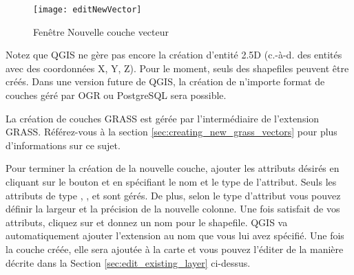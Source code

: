 \begin{itemize}
\begin{figure}[ht]
  \begin{center}
  \caption{Fenêtre Nouvelle couche vecteur \nixcaption}\label{fig:newvectorlayer}\smallskip
  \texttt{[image: editNewVector]}
\end{center}
\end{figure}

Notez que QGIS ne gère pas encore la création d'entité 2.5D (c.-à-d. des entités avec des coordonnées X, Y, Z). Pour le moment, seuls des shapefiles peuvent être créés. Dans une version future de QGIS, la création de n'importe format de couches géré par OGR ou PostgreSQL sera possible.

La création de couches GRASS est gérée par l'intermédiaire de l'extension GRASS. Référez-vous à la section \ref{sec:creating_new_grass_vectors} pour plus d'informations sur ce sujet.

Pour terminer la création de la nouvelle couche, ajouter les attributs désirés en cliquant sur le bouton  et en spécifiant le nom et le type de l'attribut. Seuls les attributs de type , , et  sont gérés. De plus, selon le type d'attribut vous pouvez définir la largeur et la précision de la nouvelle colonne. Une fois satisfait de vos attributs, cliquez sur  et donnez un nom pour le shapefile. QGIS va automatiquement ajouter l'extension  au nom que vous lui avez spécifié. Une fois la couche créée, elle sera ajoutée à la carte et vous pouvez l'éditer de la manière décrite dans la Section \ref{sec:edit_existing_layer} ci-dessus.


\end{itemize}

